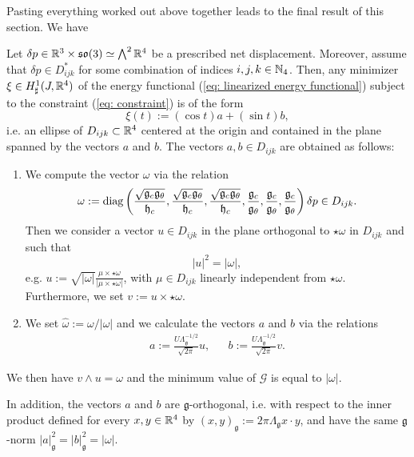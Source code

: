 Pasting everything worked out above together leads to the final result of this section. We have


\begin{theorem}
\label{thm:optimal control curves in the simple case}
Let $\delta p \in \mathbb{R}^3 \times \mathfrak{so}(3) \simeq \bigwedge^2 \mathbb{R}^4$ be a prescribed net displacement. Moreover, assume that $\delta p \in D_{ijk}^*$ for some combination of indices $i,j,k \in \mathbb{N}_4$. Then, any minimizer $\xi \in H_{\sharp}^1(J, \mathbb{R}^4)$ of the energy functional (\ref{eq: linearized energy functional}) subject to the constraint (\ref{eq: constraint}) is of the form
\begin{equation}
\xi(t) := (\cos t) a + (\sin t) b,
\end{equation}
i.e. an ellipse of $D_{ijk} \subset \mathbb{R}^4$ centered at the origin and contained in the plane spanned by the vectors $a$ and $b$. The vectors $a,b \in D_{ijk}$ are obtained as follows:
\begin{enumerate}
\item We compute the vector $\omega$ via the relation
\begin{equation}
\omega := \operatorname{diag} \left (\frac{\sqrt{\mathfrak{g}_c \mathfrak{g}_{\theta}}}{\mathfrak{h}_c}, \frac{\sqrt{\mathfrak{g}_c \mathfrak{g}_{\theta}}}{\mathfrak{h}_c}, \frac{\sqrt{\mathfrak{g}_c \mathfrak{g}_{\theta}}}{\mathfrak{h}_c}, \frac{\mathfrak{g}_c}{\mathfrak{g}_\theta}, \frac{\mathfrak{g}_c}{\mathfrak{g}_\theta}, \frac{\mathfrak{g}_c}{\mathfrak{g}_\theta} \right ) \delta p \in D_{ijk}.
\end{equation}
Then we consider a vector $u \in D_{ijk}$ in the plane orthogonal to $\star \omega$ in $D_{ijk}$ and such that
\begin{equation}
\label{eq:global minimizer condition}
|u|^2 = |\omega|,
\end{equation}
e.g. $u := \sqrt{|\omega|} \frac{\mu \times \star \omega}{|\mu \times \star \omega|}$, with $\mu \in D_{ijk}$ linearly independent from $\star \omega$. Furthermore, we set $v := u \times \star \omega$.

\item We set $\hat{\omega} := \omega/|\omega|$ and we calculate the vectors $a$ and $b$ via the relations
\begin{equation}
\label{eq:global minimizer form}
\begin{aligned}
a := \frac{U \Lambda_{\mathfrak{g}}^{-1/2}}{\sqrt{2 \pi}} u,&& b := \frac{U \Lambda_{\mathfrak{g}}^{-1/2}}{\sqrt{2 \pi}} v.
\end{aligned}
\end{equation}
\end{enumerate}
We then have $ v \wedge u = \omega$ and the minimum value of $\mathcal{G}$ is equal to $|\omega|$.

In addition, the vectors $a$ and $b$ are $\mathfrak{g}$-orthogonal, i.e. with respect to the inner product defined for every $x,y \in \mathbb{R}^4$ by $(x, y)_{\mathfrak{g}} := 2 \pi \Lambda_{\mathfrak{g}} x \cdot y$, and have the same $\mathfrak{g}$-norm $|a|_{\mathfrak{g}}^2 = |b|_{\mathfrak{g}}^2 = |\omega|$. 
\end{theorem}

